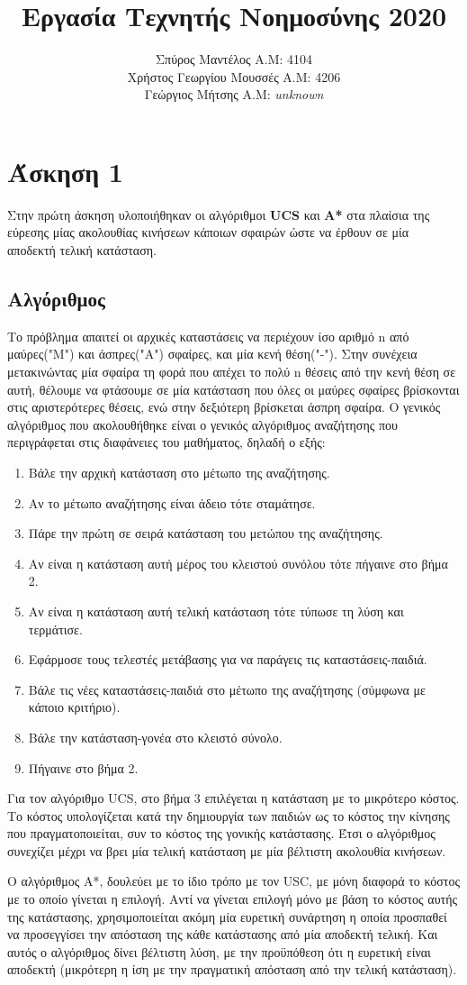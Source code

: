 \documentclass{article}
\title{Εργασία Τεχνητής Νοημοσύνης 2020}
\author{Σπύρος Μαντέλος Α.Μ: 4104\\Χρήστος Γεωργίου Μουσσές Α.Μ: 4206\\Γεώργιος Μήτσης Α.Μ: \textit{unknown}}
\date{}
\begin{document}
\maketitle
\section*{Άσκηση 1}
Στην πρώτη άσκηση υλοποιήθηκαν οι αλγόριθμοι \textbf{UCS} και \textbf{A*} στα πλαίσια της εύρεσης μίας ακολουθίας κινήσεων κάποιων σφαιρών ώστε να έρθουν σε μία αποδεκτή τελική κατάσταση.
\subsection*{Αλγόριθμος}
Το πρόβλημα απαιτεί οι αρχικές καταστάσεις να περιέχουν ίσο αριθμό n από μαύρες("Μ") και άσπρες("Α") σφαίρες, και μία κενή θέση("-"). Στην συνέχεια μετακινώντας μία σφαίρα τη φορά που απέχει το πολύ n θέσεις από την κενή θέση σε αυτή, θέλουμε να φτάσουμε σε μία κατάσταση που όλες οι μαύρες σφαίρες βρίσκονται στις αριστερότερες θέσεις, ενώ στην δεξιότερη βρίσκεται άσπρη σφαίρα.
Ο γενικός αλγόριθμος που ακολουθήθηκε είναι ο γενικός αλγόριθμος αναζήτησης που περιγράφεται στις διαφάνειες του μαθήματος, δηλαδή ο εξής:
\begin{enumerate}
  \item Βάλε την αρχική κατάσταση στο μέτωπο της αναζήτησης.
  \item Αν το μέτωπο αναζήτησης είναι άδειο τότε σταμάτησε.
  \item Πάρε την πρώτη σε σειρά κατάσταση του μετώπου της αναζήτησης.
  \item Αν είναι η κατάσταση αυτή μέρος του κλειστού συνόλου τότε πήγαινε
  στο βήμα 2. 
  \item Αν είναι η κατάσταση αυτή τελική κατάσταση τότε τύπωσε τη λύση και τερμάτισε.
  \item Εφάρμοσε τους τελεστές μετάβασης για να παράγεις τις καταστάσεις-παιδιά.
  \item Βάλε τις νέες καταστάσεις-παιδιά στο μέτωπο της αναζήτησης (σύμφωνα με κάποιο κριτήριο).
  \item Βάλε την κατάσταση-γονέα στο κλειστό σύνολο. 
  \item Πήγαινε στο βήμα 2.
\end{enumerate}
Για τον αλγόριθμο UCS, στο βήμα 3 επιλέγεται η κατάσταση με το μικρότερο κόστος. Το κόστος υπολογίζεται κατά την δημιουργία των παιδιών ως το κόστος την κίνησης που πραγματοποιείται, συν το κόστος της γονικής κατάστασης. Έτσι ο αλγόριθμος συνεχίζει μέχρι να βρει μία τελική κατάσταση με μία βέλτιστη ακολουθία κινήσεων.\par 
Ο αλγόριθμος A*, δουλεύει με το ίδιο τρόπο με τον USC, με μόνη διαφορά το κόστος με το οποίο γίνεται η επιλογή. Αντί να γίνεται επιλογή μόνο με βάση το κόστος αυτής της κατάστασης, χρησιμοποιείται ακόμη μία ευρετική συνάρτηση η οποία προσπαθεί να προσεγγίσει την απόσταση της κάθε κατάστασης από μία αποδεκτή τελική. Και αυτός ο αλγόριθμος δίνει βέλτιστη λύση, με την προϋπόθεση ότι η ευρετική είναι αποδεκτή (μικρότερη η ίση με την πραγματική απόσταση από την τελική κατάσταση).
\end{document}
